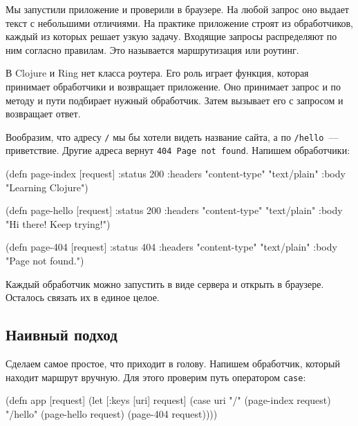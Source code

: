 
Мы запустили приложение и проверили в браузере. На любой запрос оно выдает текст
с небольшими отличиями. На практике приложение строят из обработчиков, каждый из
которых решает узкую задачу. Входящие запросы распределяют по ним согласно
правилам. Это называется маршрутизация или роутинг.

В Clojure и Ring нет класса роутера. Его роль играет функция, которая принимает
обработчики и возвращает приложение. Оно принимает запрос и по методу и пути
подбирает нужный обработчик. Затем вызывает его с запросом и возвращает ответ.


Вообразим, что адресу \verb|/| мы бы хотели видеть название сайта, а по
\verb|/hello|~--- приветствие. Другие адреса вернут \verb|404 Page not found|.
Напишем обработчики:

\begin{english}
  \begin{clojure}
(defn page-index [request]
  {:status 200
   :headers {"content-type" "text/plain"}
   :body "Learning Clojure"})

(defn page-hello [request]
  {:status 200
   :headers {"content-type" "text/plain"}
   :body "Hi there! Keep trying!"})

(defn page-404 [request]
  {:status 404
   :headers {"content-type" "text/plain"}
   :body "Page not found."})
  \end{clojure}
\end{english}

Каждый обработчик можно запустить в виде сервера и открыть в браузере. Осталось
связать их в единое целое.

\subsection{Наивный подход}

Сделаем самое простое, что приходит в голову. Напишем обработчик, который
находит маршрут вручную. Для этого проверим путь оператором \verb|case|:

\begin{english}
  \begin{clojure}
(defn app [request]
  (let [{:keys [uri]} request]
    (case uri
      "/"      (page-index request)
      "/hello" (page-hello request)
      (page-404 request))))
  \end{clojure}
\end{english}

